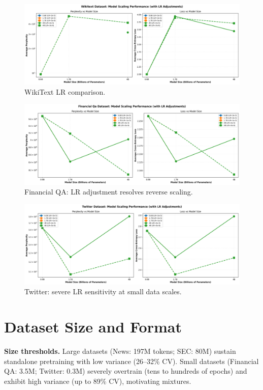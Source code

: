 \begin{figure}[H]
  \centering
  \includegraphics[width=\textwidth]{../thesis/figures/scaling_wikitext.png}
  \caption{WikiText LR comparison.}\label{fig:scaling_wikitext}
\end{figure}

\begin{figure}[H]
  \centering
  \includegraphics[width=\textwidth]{../thesis/figures/scaling_financial_qa.png}
  \caption{Financial QA: LR adjustment resolves reverse scaling.}\label{fig:scaling_financial_qa}
\end{figure}

\begin{figure}[H]
  \centering
  \includegraphics[width=\textwidth]{../thesis/figures/scaling_twitter.png}
  \caption{Twitter: severe LR sensitivity at small data scales.}\label{fig:scaling_twitter}
\end{figure}

\section{Dataset Size and Format}
\textbf{Size thresholds.} Large datasets (News: 197M tokens; SEC: 80M) sustain standalone pretraining with low variance (26--32\% CV). Small datasets (Financial QA: 3.5M; Twitter: 0.3M) severely overtrain (tens to hundreds of epochs) and exhibit high variance (up to 89\% CV), motivating mixtures.

